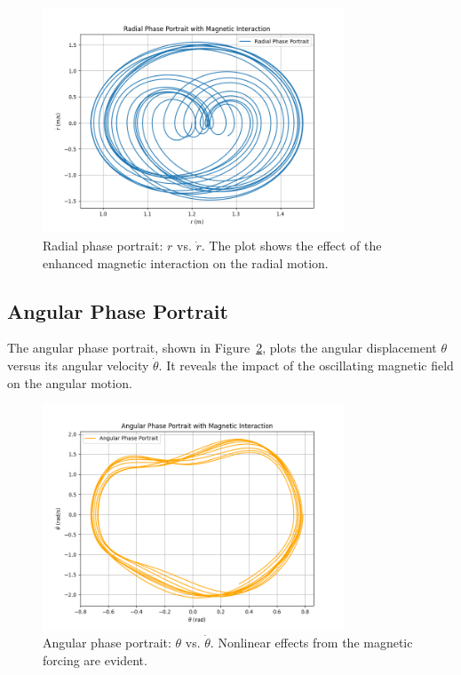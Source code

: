 \documentclass[12pt]{article}
\begin{document}
\begin{figure}[h!]
    \centering
    \includegraphics[width=0.8\textwidth]{radial_phase_portrait_magnetic.png}
    \caption{Radial phase portrait: \( r \) vs. \( \dot{r} \). The plot shows the effect of the enhanced magnetic interaction on the radial motion.}
    \label{fig:radial_phase_portrait_magnetic}
\end{figure}

\subsection{Angular Phase Portrait}
The angular phase portrait, shown in Figure~\ref{fig:angular_phase_portrait_magnetic}, plots the angular displacement \( \theta \) versus its angular velocity \( \dot{\theta} \). It reveals the impact of the oscillating magnetic field on the angular motion.

\begin{figure}[h!]
    \centering
    \includegraphics[width=0.8\textwidth]{angular_phase_portrait_magnetic.png}
    \caption{Angular phase portrait: \( \theta \) vs. \( \dot{\theta} \). Nonlinear effects from the magnetic forcing are evident.}
    \label{fig:angular_phase_portrait_magnetic}
\end{figure}
\end{document}
